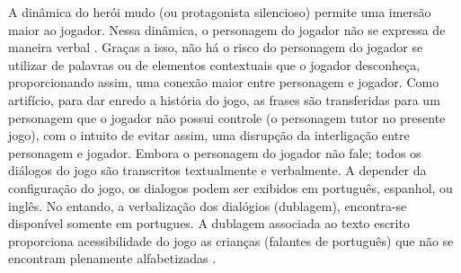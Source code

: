 

A dinâmica do herói mudo (ou protagonista silencioso) permite uma imersão maior ao jogador. Nessa dinâmica, o personagem do jogador não se expressa de maneira verbal \cite{domsch2017dialogue}. Graças a isso, não há o risco do personagem do jogador se utilizar de palavras ou de elementos contextuais que o jogador desconheça, proporcionando assim, uma conexão maior entre personagem e jogador. Como artifício, para dar enredo a história do jogo, as frases são transferidas para um personagem que o jogador não possui controle (o personagem tutor no presente jogo), com o intuito de evitar assim, uma disrupção da interligação entre personagem e jogador. Embora o personagem do jogador não fale; todos os diálogos do jogo são transcritos textualmente e verbalmente. A depender da configuração do jogo, os dialogos podem ser exibidos em português, espanhol, ou inglês. No entando, a verbalização dos dialógios (dublagem), encontra-se disponível somente em portugues. A dublagem associada ao texto escrito proporciona acessibilidade do jogo as crianças (falantes de português) que não se encontram plenamente alfabetizadas \cite{limeira2015avaliaccao}. 





